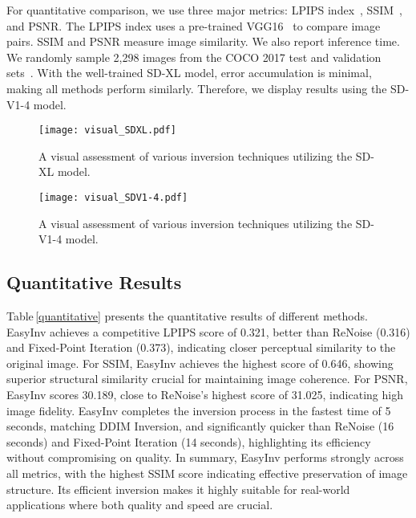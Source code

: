 \documentclass[letterpaper]{article} \usepackage{aaai25}  \usepackage{times}  \usepackage{helvet}  \usepackage{courier}  \usepackage[hyphens]{url}  \usepackage{graphicx} \urlstyle{rm} \def\UrlFont{\rm}  \usepackage{natbib}  \usepackage{caption} \frenchspacing  \setlength{\pdfpagewidth}{8.5in} \setlength{\pdfpageheight}{11in} \usepackage{algorithm}
\begin{document}
For quantitative comparison, we use three major metrics: LPIPS index~\cite{zhang2018unreasonable}, SSIM~\cite{wang2004image}, and PSNR. The LPIPS index uses a pre-trained VGG16~\cite{simonyan2015very} to compare image pairs. SSIM and PSNR measure image similarity. We also report inference time. We randomly sample 2,298 images from the COCO 2017 test and validation sets~\cite{COCO}. With the well-trained SD-XL model, error accumulation is minimal, making all methods perform similarly. Therefore, we display results using the SD-V1-4 model.



\begin{figure}[!t]
    \centering
    \texttt{[image: visual\_SDXL.pdf]}
    \caption{A visual assessment of various inversion techniques utilizing the SD-XL model.}
    \label{SDXL_compare}
\end{figure}


\begin{figure}[!t]
    \centering
    \texttt{[image: visual\_SDV1-4.pdf]}
    \caption{A visual assessment of various inversion techniques utilizing the SD-V1-4 model.}
    \label{SDV1-4_compare}
\end{figure}




\subsection{Quantitative Results}
\label{sec:quantitative}
Table\,\ref{quantitative} presents the quantitative results of different methods. EasyInv achieves a competitive LPIPS score of 0.321, better than ReNoise (0.316) and Fixed-Point Iteration (0.373), indicating closer perceptual similarity to the original image. For SSIM, EasyInv achieves the highest score of 0.646, showing superior structural similarity crucial for maintaining image coherence. For PSNR, EasyInv scores 30.189, close to ReNoise's highest score of 31.025, indicating high image fidelity. EasyInv completes the inversion process in the fastest time of 5 seconds, matching DDIM Inversion, and significantly quicker than ReNoise (16 seconds) and Fixed-Point Iteration (14 seconds), highlighting its efficiency without compromising on quality. In summary, EasyInv performs strongly across all metrics, with the highest SSIM score indicating effective preservation of image structure. Its efficient inversion makes it highly suitable for real-world applications where both quality and speed are crucial.
\end{document}
